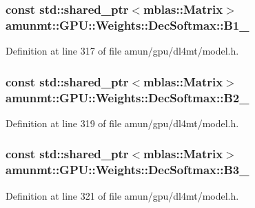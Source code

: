 \subsubsection[{\texorpdfstring{B1\+\_\+}{B1_}}]{\setlength{\rightskip}{0pt plus 5cm}const std\+::shared\+\_\+ptr$<${\bf mblas\+::\+Matrix}$>$ amunmt\+::\+G\+P\+U\+::\+Weights\+::\+Dec\+Softmax\+::\+B1\+\_\+}\hypertarget{structamunmt_1_1GPU_1_1Weights_1_1DecSoftmax_a89de082b62b2f4b8e4a3218100191c81}{}\label{structamunmt_1_1GPU_1_1Weights_1_1DecSoftmax_a89de082b62b2f4b8e4a3218100191c81}


Definition at line 317 of file amun/gpu/dl4mt/model.\+h.

\subsubsection[{\texorpdfstring{B2\+\_\+}{B2_}}]{\setlength{\rightskip}{0pt plus 5cm}const std\+::shared\+\_\+ptr$<${\bf mblas\+::\+Matrix}$>$ amunmt\+::\+G\+P\+U\+::\+Weights\+::\+Dec\+Softmax\+::\+B2\+\_\+}\hypertarget{structamunmt_1_1GPU_1_1Weights_1_1DecSoftmax_af1abfc82b60f11afeb544bff95e0dc21}{}\label{structamunmt_1_1GPU_1_1Weights_1_1DecSoftmax_af1abfc82b60f11afeb544bff95e0dc21}


Definition at line 319 of file amun/gpu/dl4mt/model.\+h.

\subsubsection[{\texorpdfstring{B3\+\_\+}{B3_}}]{\setlength{\rightskip}{0pt plus 5cm}const std\+::shared\+\_\+ptr$<${\bf mblas\+::\+Matrix}$>$ amunmt\+::\+G\+P\+U\+::\+Weights\+::\+Dec\+Softmax\+::\+B3\+\_\+}\hypertarget{structamunmt_1_1GPU_1_1Weights_1_1DecSoftmax_a32f075c1adcc86d06031ea5a9239ca6c}{}\label{structamunmt_1_1GPU_1_1Weights_1_1DecSoftmax_a32f075c1adcc86d06031ea5a9239ca6c}


Definition at line 321 of file amun/gpu/dl4mt/model.\+h.

